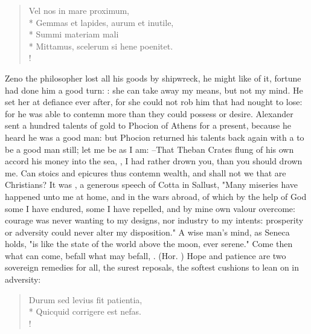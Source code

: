 {\begin{latin}
\begin{verse}%
Vel nos in mare proximum,\\*
Gemmas et lapides, aurum et inutile,\\*
Summi materiam mali\\*
Mittamus, scelerum si hene poenitet.\\!
\end{verse}%
\end{latin}

Zeno the philosopher lost all his goods by shipwreck, he might like of it, fortune had done him a good turn: : she can take away my means, but not my mind. He set her at defiance ever after, for she could not rob him that had nought to lose: for he was able to contemn more than they could possess or desire. Alexander sent a hundred talents of gold to Phocion of Athens for a present, because he heard he was a good man: but Phocion returned his talents back again with a  to be a good man still; let me be as I am:  --That Theban Crates flung of his own accord his money into the sea, , I had rather drown you, than you should drown me. Can stoics and epicures thus contemn wealth, and shall not we that are Christians? It was , a generous speech of Cotta in Sallust, "Many miseries have happened unto me at home, and in the wars abroad, of which by the help of God some I have endured, some I have repelled, and by mine own valour overcome: courage was never wanting to my designs, nor industry to my intents: prosperity or adversity could never alter my disposition." A wise man's mind, as Seneca holds, "is like the state of the world above the moon, ever serene." Come then what can come, befall what may befall, . (Hor. ) Hope and patience are two sovereign remedies for all, the surest reposals, the softest cushions to lean on in adversity:

\begin{latin}
\begin{verse}%
Durum sed levius fit patientia,\\*
Quicquid corrigere est nefas.\\!
\end{verse}%
\end{latin}



}
